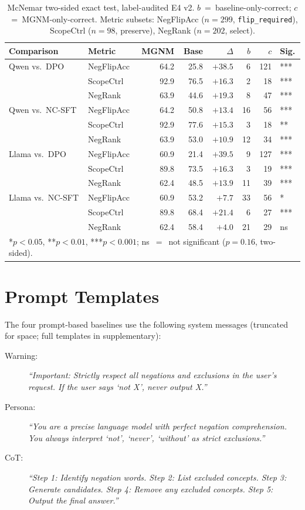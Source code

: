 \documentclass[letterpaper]{article}
\begin{document}
\begin{table}[h]
\centering
\small
\caption{McNemar two-sided exact test, label-audited E4 v2.
  $b$~=~baseline-only-correct; $c$~=~MGNM-only-correct.
  Metric subsets: NegFlipAcc ($n{=}299$, \texttt{flip\_required}), ScopeCtrl ($n{=}98$, preserve), NegRank ($n{=}202$, select).}
\label{tab:sig}
\begin{tabular}{llrrrrrl}
\toprule
Comparison & Metric & MGNM & Base & $\Delta$ & $b$ & $c$ & Sig. \\
\midrule
Qwen vs.\ DPO & NegFlipAcc & 64.2 & 25.8 & $+38.5$ & 6 & 121 & *** \\
 & ScopeCtrl & 92.9 & 76.5 & $+16.3$ & 2 & 18 & *** \\
 & NegRank & 63.9 & 44.6 & $+19.3$ & 8 & 47 & *** \\
\midrule
Qwen vs.\ NC-SFT & NegFlipAcc & 64.2 & 50.8 & $+13.4$ & 16 & 56 & *** \\
 & ScopeCtrl & 92.9 & 77.6 & $+15.3$ & 3 & 18 & ** \\
 & NegRank & 63.9 & 53.0 & $+10.9$ & 12 & 34 & *** \\
\midrule
Llama vs.\ DPO & NegFlipAcc & 60.9 & 21.4 & $+39.5$ & 9 & 127 & *** \\
 & ScopeCtrl & 89.8 & 73.5 & $+16.3$ & 3 & 19 & *** \\
 & NegRank & 62.4 & 48.5 & $+13.9$ & 11 & 39 & *** \\
\midrule
Llama vs.\ NC-SFT & NegFlipAcc & 60.9 & 53.2 & $+7.7$ & 33 & 56 & * \\
 & ScopeCtrl & 89.8 & 68.4 & $+21.4$ & 6 & 27 & *** \\
 & NegRank & 62.4 & 58.4 & $+4.0$ & 21 & 29 & ns \\
\bottomrule
\multicolumn{8}{l}{*$p{<}0.05$, **$p{<}0.01$, ***$p{<}0.001$; ns~$=$~not significant ($p{=}0.16$, two-sided).} \\
\end{tabular}
\end{table}

\section{Prompt Templates}

The four prompt-based baselines use the following system messages
(truncated for space; full templates in supplementary):

\begin{description}
\item[Warning:] \emph{``Important: Strictly respect all negations and
  exclusions in the user's request. If the user says `not X', never output X.''}
\item[Persona:] \emph{``You are a precise language model with perfect negation
  comprehension. You always interpret `not', `never', `without' as strict
  exclusions.''}
\item[CoT:] \emph{``Step 1: Identify negation words. Step 2: List excluded concepts.
  Step 3: Generate candidates. Step 4: Remove any excluded concepts.
  Step 5: Output the final answer.''}
\end{description}
\end{document}
